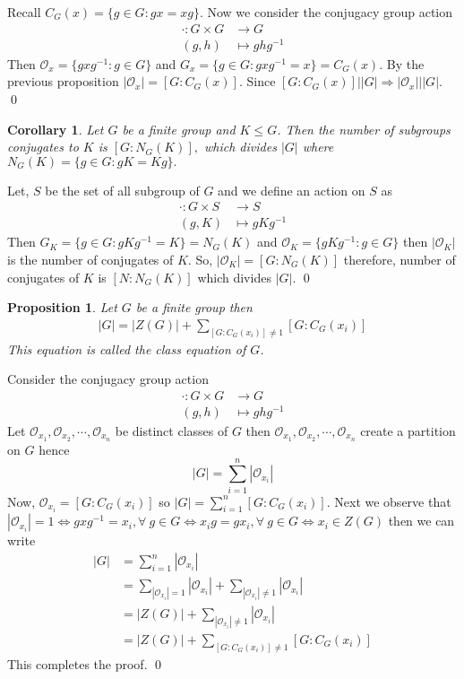 \documentclass[11pt]{amsart}
\newtheorem{proposition}[theorem]{Proposition}%
\newtheorem{corollary}[theorem]{Corollary}%
\begin{document}
\proof Recall $C_G(x)=\{g\in G: gx=xg\}$. Now we consider the conjugacy group action \begin{align*}
\cdot:G\times G&\to G\\
(g,h)&\mapsto ghg^{-1}
\end{align*}
Then $\mathcal{O}_x=\{gxg^{-1}:g\in G\}$ and $G_x=\{g\in G:gxg^{-1}=x\}=C_G(x).$ By the previous proposition $|\mathcal{O}_x|=[G:C_G(x)].$ Since $[G:C_G(x)]\big||G| \Rightarrow |\mathcal{O}_x|\big||G|.$ \qed
\begin{corollary}
Let $G$ be a finite group and $K\leq G$. Then the number of subgroups conjugates to $K$ is $[G:N_G(K)],$ which divides $|G|$ where $N_G(K)=\{g\in G:gK=Kg\}.$
\end{corollary}
\proof Let, $S$ be the set of all subgroup of $G$ and we define an action on $S$ as \begin{align*}
\cdot:G\times S&\to S\\
(g,K)&\mapsto gKg^{-1}
\end{align*}
Then $G_K=\{g\in G:gKg^{-1}=K\}=N_G(K)$ and $\mathcal{O}_K=\{gKg^{-1}:g\in G\}$ then $|\mathcal{O}_K|$ is the number of conjugates of $K$. So, $|\mathcal{O}_K|=[G:N_G(K)]$ therefore, number of conjugates of $K$ is $[N:N_G(K)]$ which divides $|G|$. \qed

\begin{proposition}
Let $G$ be a finite group then \begin{align*}
|G|=|Z(G)|+\displaystyle\sum_{[G:C_G(x_i)]\neq 1} [G:C_G(x_i)] 
\end{align*}
This equation is called the class equation of $G$.
\end{proposition}
\proof Consider the conjugacy group action \begin{align*}
\cdot:G\times G&\to G\\
(g,h)&\mapsto ghg^{-1}
\end{align*}
Let $\mathcal{O}_{x_1},\mathcal{O}_{x_2},\cdots,\mathcal{O}_{x_n}$ be distinct classes of $G$ then $\mathcal{O}_{x_1},\mathcal{O}_{x_2},\cdots,\mathcal{O}_{x_n}$ create a partition on $G$ hence $$|G|=\displaystyle\sum_{i=1}^n |\mathcal{O}_{x_i}|$$ Now, $\mathcal{O}_{x_i}=[G:C_G(x_i)]$ so $|G|=\displaystyle\sum_{i=1}^n [G:C_G(x_i)].$ Next we observe that $|\mathcal{O}_{x_i}|=1 \Leftrightarrow gxg^{-1}=x_i,\forall~g\in G \Leftrightarrow x_ig=gx_i,\forall~ g\in G \Leftrightarrow x_i\in Z(G)$ then we can write \begin{align*}
|G|&=\displaystyle\sum_{i=1}^n |\mathcal{O}_{x_i}|\\
 &=\displaystyle\sum_{|\mathcal{O}_{x_i}|=1} |\mathcal{O}_{x_i}|+\displaystyle\sum_{|\mathcal{O}_{x_i}|\neq 1}|\mathcal{O}_{x_i}|\\
 &=|Z(G)|+\displaystyle\sum_{|\mathcal{O}_{x_i}|\neq 1} |\mathcal{O}_{x_i}|\\
 &=|Z(G)|+\displaystyle\sum_{[G:C_G(x_i)]\neq 1} [G:C_G(x_i)]
\end{align*}
This completes the proof.  \qed\\
\end{document}
